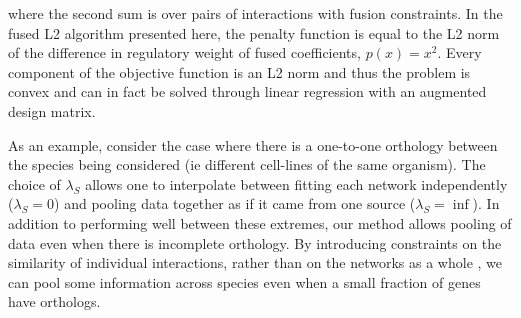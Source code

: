 \documentclass[11pt]{article}
\begin{document}
where the second sum is over pairs of interactions with fusion constraints. 
In the fused L2 algorithm presented here, the penalty function is equal to the L2 norm of the difference in regulatory weight of fused coefficients, $p(x)=x^2$. 
Every component of the objective function is an L2 norm and thus the problem is convex and can in fact be solved through linear regression with an augmented design matrix. 

As an example, consider the case where there is a one-to-one orthology between the species being considered (ie different cell-lines of the same organism). 
The choice of $\lambda_S$ allows one to interpolate between fitting each network independently ($\lambda_S=0$) and pooling data together as if it came from one source ($\lambda_S=\inf$). 
In addition to performing well between these extremes, our method allows pooling of data even when there is incomplete orthology. 
By introducing constraints on the similarity of individual interactions, rather than on the networks as a whole \cite{parikh2011treegl}, we can pool some information across species even when a small fraction of genes have orthologs. 
\end{document}
